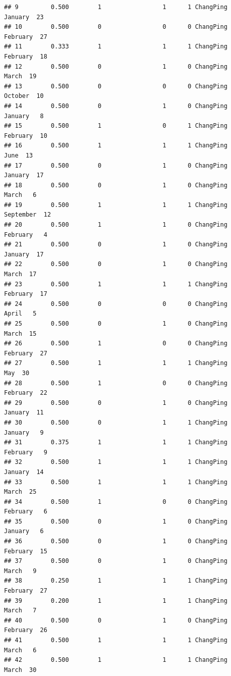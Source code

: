 \documentclass[
]{article}
\begin{document}
\begin{verbatim}
## 9         0.500        1                 1      1 ChangPing   January  23
## 10        0.500        0                 0      0 ChangPing  February  27
## 11        0.333        1                 1      1 ChangPing  February  18
## 12        0.500        0                 1      0 ChangPing     March  19
## 13        0.500        0                 0      0 ChangPing   October  10
## 14        0.500        0                 1      0 ChangPing   January   8
## 15        0.500        1                 0      1 ChangPing  February  10
## 16        0.500        1                 1      1 ChangPing      June  13
## 17        0.500        0                 1      0 ChangPing   January  17
## 18        0.500        0                 1      0 ChangPing     March   6
## 19        0.500        1                 1      1 ChangPing September  12
## 20        0.500        1                 1      0 ChangPing  February   4
## 21        0.500        0                 1      0 ChangPing   January  17
## 22        0.500        0                 1      0 ChangPing     March  17
## 23        0.500        1                 1      1 ChangPing  February  17
## 24        0.500        0                 0      0 ChangPing     April   5
## 25        0.500        0                 1      0 ChangPing     March  15
## 26        0.500        1                 0      0 ChangPing  February  27
## 27        0.500        1                 1      1 ChangPing       May  30
## 28        0.500        1                 0      0 ChangPing  February  22
## 29        0.500        0                 1      0 ChangPing   January  11
## 30        0.500        0                 1      1 ChangPing   January   9
## 31        0.375        1                 1      1 ChangPing  February   9
## 32        0.500        1                 1      1 ChangPing   January  14
## 33        0.500        1                 1      1 ChangPing     March  25
## 34        0.500        1                 0      0 ChangPing  February   6
## 35        0.500        0                 1      0 ChangPing   January   6
## 36        0.500        0                 1      0 ChangPing  February  15
## 37        0.500        0                 1      0 ChangPing     March   9
## 38        0.250        1                 1      1 ChangPing  February  27
## 39        0.200        1                 1      1 ChangPing     March   7
## 40        0.500        0                 1      0 ChangPing  February  26
## 41        0.500        1                 1      1 ChangPing     March   6
## 42        0.500        1                 1      1 ChangPing     March  30

\end{verbatim}
\end{document}
